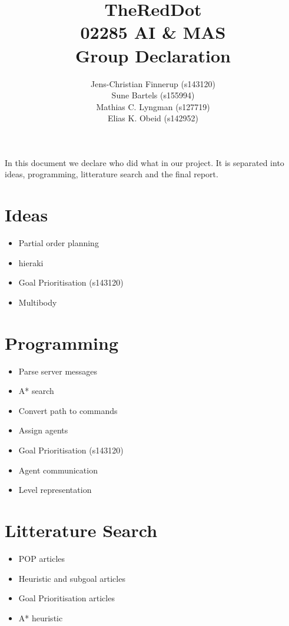 \documentclass[a4paper]{article}
\title{TheRedDot\\02285 AI \& MAS\\Group Declaration}
\author{
Jens-Christian Finnerup (s143120)\\
Sune Bartels  (s155994)\\
Mathias C. Lyngman (s127719)\\
Elias K. Obeid (s142952)}
\begin{document}
\maketitle

In this document we declare who did what in our project. It is separated into
ideas, programming, litterature search and the final report.\\

\section{Ideas}
\begin{itemize}
  \item Partial order planning
  \item hieraki
  \item Goal Prioritisation (s143120)
  \item Multibody
\end{itemize}

\section{Programming}
\begin{itemize}
  \item Parse server messages
  \item A* search
  \item Convert path to commands
  \item Assign agents
  \item Goal Prioritisation (s143120)
  \item Agent communication
  \item Level representation
\end{itemize}

\section{Litterature Search}
\begin{itemize}
  \item POP articles
  \item Heuristic and subgoal articles
  \item Goal Prioritisation articles
  \item A* heuristic
\end{itemize}
\end{document}
